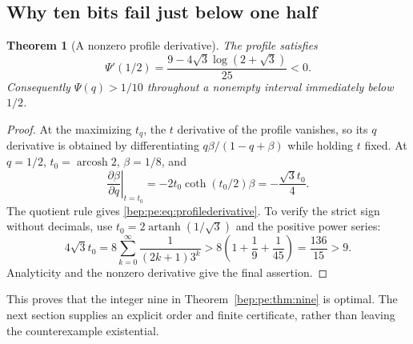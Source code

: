 \documentclass[11pt]{article}
\numberwithin{equation}{section}
\newtheorem{theorem}{Theorem}[section]
\theoremstyle{definition}
\theoremstyle{remark}
\newcommand{\arcosh}{\operatorname{arcosh}}
\newcommand{\artanh}{\operatorname{artanh}}
\begin{document}
\subsection{Why ten bits fail just below one half}
\begin{theorem}[A nonzero profile derivative]\label{bep:pe:thm:derivative}
The profile satisfies
\begin{equation}
 \Psi'(1/2)=\frac{9-4\sqrt3\log(2+\sqrt3)}{25}<0.\label{bep:pe:eq:profilederivative}
\end{equation}
Consequently $\Psi(q)>1/10$ throughout a nonempty interval immediately
below $1/2$.
\end{theorem}
\begin{proof}
At the maximizing $t_q$, the $t$ derivative of the profile vanishes, so
its $q$ derivative is obtained by differentiating
$q\beta/(1-q+\beta)$ while holding $t$ fixed. At
$q=1/2$, $t_0=\arcosh2$, $\beta=1/8$, and
\[
 \left.\frac{\partial\beta}{\partial q}\right|_{t=t_0}
 =-2t_0\coth(t_0/2)\beta=-\frac{\sqrt3 t_0}{4}.
\]
The quotient rule gives \eqref{bep:pe:eq:profilederivative}.
To verify the strict sign without decimals, use
$t_0=2\artanh(1/\sqrt3)$ and the positive power series:
\[
 4\sqrt3t_0=8\sum_{k=0}^{\infty}\frac1{(2k+1)3^k}
 >8\left(1+\frac19+\frac1{45}\right)=\frac{136}{15}>9.
\]
Analyticity and the nonzero derivative give the final assertion.
\end{proof}
This proves that the integer nine in Theorem~\ref{bep:pe:thm:nine} is optimal.
The next section supplies an explicit order and finite certificate,
rather than leaving the counterexample existential.
\end{document}
